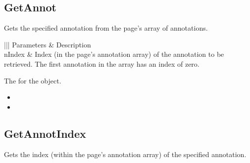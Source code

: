 \documentclass[letterpaper,12pt,english,openany,oneside]{sphinxmanual}
\begin{document}
\subsection{GetAnnot}
\label{\detokenize{IAC_API_OLE_Objects:getannot}}
Gets the specified annotation from the page’s array of annotations.


\begin{sphinxVerbatim}[commandchars=\\\{\}]
  
\end{sphinxVerbatim}
\label{\detokenize{IAC_API_OLE_Objects:parameters-75}}


\begin{savenotes}\sphinxattablestart
\centering
{}\label{\detokenize{IAC_API_OLE_Objects:section-84}}\nobreak
\begin{tabular}[t]{|||}
\hline
\sphinxstyletheadfamily 
Parameters
&\sphinxstyletheadfamily 
Description
\\
\hline
nIndex
&
Index (in the page’s annotation array) of the annotation to be retrieved. The first annotation in the array has an index of zero.
\\
\hline
\end{tabular}
\par
\sphinxattableend\end{savenotes}


The  for the  object.

\label{\detokenize{IAC_API_OLE_Objects:related-methods-120}}
\begin{itemize}
\item {} 
 

\item {} 
 

\end{itemize}




\subsection{GetAnnotIndex}
\label{\detokenize{IAC_API_OLE_Objects:getannotindex}}
Gets the index (within the page’s annotation array) of the specified annotation.
\end{document}
